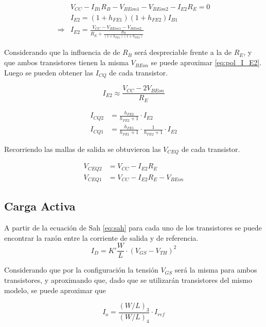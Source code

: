 \begin{align*}
    & V_{CC}-I_{B1}R_{B}-V_{BEon1}-V_{BEon2}-I_{E2}R_{E}=0 \\
    & I_{E2} = \left(1 + h_{FE1}\right)\left(1 + h_{FE2}\right) I_{B1} \\
    \Rightarrow & I_{E2} = \frac{V_{CC}-V_{BEon1}-V_{BEon2}}{R_E+\frac{R_B}{\left(1 + h_{FE1}\right)\left(1 + h_{FE2}\right)}}
\end{align*}

Considerando que la influencia de de $R_B$ será despreciable frente a la de $R_E$, y que ambos transistores tienen la misma $V_{BEon}$ se puede aproximar \eqref{eq:pol_I_E2}. Luego se pueden obtener las $I_{CQ}$ de cada transistor.

\begin{equation}
    I_{E2} \approx \frac{V_{CC}-2V_{BEon}}{R_E}
    \label{eq:pol_I_E2}
\end{equation}

\begin{align}
    I_{CQ2} &= \frac{h_{FE2}}{h_{FE2}+1}\cdot I_{E2} \label{eq:icq2} \\ 
    I_{CQ1} &= \frac{h_{FE1}}{h_{FE1}+1}\cdot \frac{1}{h_{FE2}+1}\cdot I_{E2} \label{eq:icq1}
\end{align}

Recorriendo las mallas de salida se obtuvieron las $V_{CEQ}$ de cada transistor.

\begin{align}
    V_{CEQ2} &= V_{CC} - I_{E2} R_E \\
    V_{CEQ1} &= V_{CC} - I_{E2} R_E - V_{BEon} 
\end{align}

\subsection{Carga Activa}

A partir de la ecuación de Sah \eqref{eq:sah} para cada uno de los transistores se puede encontrar la razón entre la corriente de salida y de referencia.
\begin{equation}
    I_D = K' \frac{W}{L}\cdot (V_{GS}-V_{TH})^2
    \label{eq:sah}
\end{equation}

Considerando que por la configuración la tensión $V_{GS}$ será la misma para ambos transistores, y aproximando que, dado que se utilizarán transistores del mismo modelo, se puede aproximar que 

\begin{equation}
    I_o = \frac{(W/L)_3}{(W/L)_4} \cdot I_{ref}
    \label{eq:io func iref}
\end{equation}

